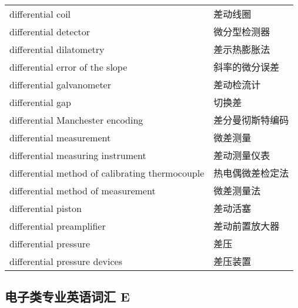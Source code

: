 \documentclass[
]{article}
\begin{document}
\begin{longtable}[]{@{}ll@{}}
differential coil & 差动线圈 \\
differential detector & 微分型检测器 \\
differential dilatometry & 差示热膨胀法 \\
differential error of the slope & 斜率的微分误差 \\
differential galvanometer & 差动检流计 \\
differential gap & 切换差 \\
differential Manchester encoding & 差分曼彻斯特编码 \\
differential measurement & 微差测量 \\
differential measuring instrument & 差动测量仪表 \\
differential method of calibrating thermocouple & 热电偶微差检定法 \\
differential method of measurement & 微差测量法 \\
differential piston & 差动活塞 \\
differential preamplifier & 差动前置放大器 \\
differential pressure & 差压 \\
differential pressure devices & 差压装置 \\
\bottomrule()
\end{longtable}

\hypertarget{ux7535ux5b50ux7c7bux4e13ux4e1aux82f1ux8bedux8bcdux6c47-e}{%
\subsection{\texorpdfstring{电子类专业英语词汇 E
}{电子类专业英语词汇 E }}\label{ux7535ux5b50ux7c7bux4e13ux4e1aux82f1ux8bedux8bcdux6c47-e}}
\end{document}
